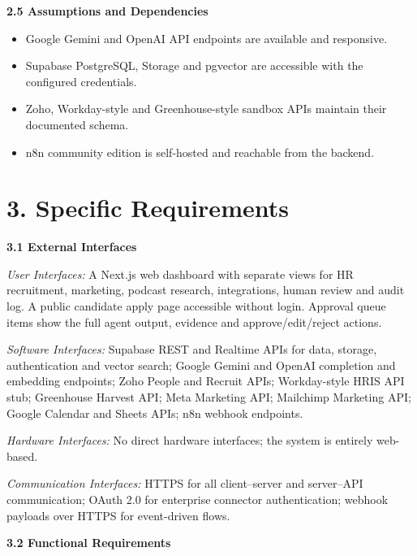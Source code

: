 \vspace{8pt}
\noindent\textbf{2.5 Assumptions and Dependencies}
\begin{itemize}
  \item Google Gemini and OpenAI API endpoints are available and responsive.
  \item Supabase PostgreSQL, Storage and pgvector are accessible with the configured credentials.
  \item Zoho, Workday-style and Greenhouse-style sandbox APIs maintain their documented schema.
  \item n8n community edition is self-hosted and reachable from the backend.
\end{itemize}

\vspace{16pt}
\section*{3. Specific Requirements}

\noindent\textbf{3.1 External Interfaces}

\textit{User Interfaces:} A Next.js web dashboard with separate views for HR recruitment, marketing, podcast research, integrations, human review and audit log. A public candidate apply page accessible without login. Approval queue items show the full agent output, evidence and approve/edit/reject actions.

\textit{Software Interfaces:} Supabase REST and Realtime APIs for data, storage, authentication and vector search; Google Gemini and OpenAI completion and embedding endpoints; Zoho People and Recruit APIs; Workday-style HRIS API stub; Greenhouse Harvest API; Meta Marketing API; Mailchimp Marketing API; Google Calendar and Sheets APIs; n8n webhook endpoints.

\textit{Hardware Interfaces:} No direct hardware interfaces; the system is entirely web-based.

\textit{Communication Interfaces:} HTTPS for all client--server and server--API communication; OAuth 2.0 for enterprise connector authentication; webhook payloads over HTTPS for event-driven flows.

\vspace{10pt}
\noindent\textbf{3.2 Functional Requirements}

